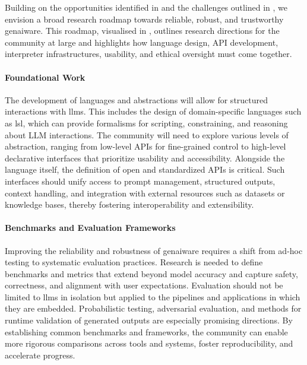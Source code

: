 \documentclass[manuscript,screen]{acmart}
\begin{document}
Building on the opportunities identified in  and the challenges outlined in , we envision a broad research roadmap towards reliable, robust, and trustworthy \ac{genai}ware. %
This roadmap, visualised in , outlines research directions for the community at large and highlights how language design, API development, interpreter infrastructures, usability, and ethical oversight must come together.

\paragraph{Foundational Work}
The development of languages and abstractions will allow for structured interactions with \acp{llm}.
This includes the design of domain-specific languages such as \ac{lsl}, which can provide formalisms for scripting, constraining, and reasoning about LLM interactions.
The community will need to explore various levels of abstraction, ranging from low-level APIs for fine-grained control to high-level declarative interfaces that prioritize usability and accessibility.
Alongside the language itself, the definition of open and standardized APIs is critical.
Such interfaces should unify access to prompt management, structured outputs, context handling, and integration with external resources such as datasets or knowledge bases, thereby fostering interoperability and extensibility.

\paragraph{Benchmarks and Evaluation Frameworks}
Improving the reliability and robustness of \ac{genai}ware %
requires a shift from ad-hoc testing to systematic evaluation practices.
Research is needed to define benchmarks and metrics that extend beyond model accuracy and capture safety, correctness, and alignment with user expectations.
Evaluation should not be limited to \acp{llm} in isolation but applied to the pipelines and applications in which they are embedded.
Probabilistic testing, adversarial evaluation, and methods for runtime validation of generated outputs are especially promising directions.
By establishing common benchmarks and frameworks, the community can enable more rigorous comparisons across tools and systems, foster reproducibility, and accelerate progress.
\end{document}
